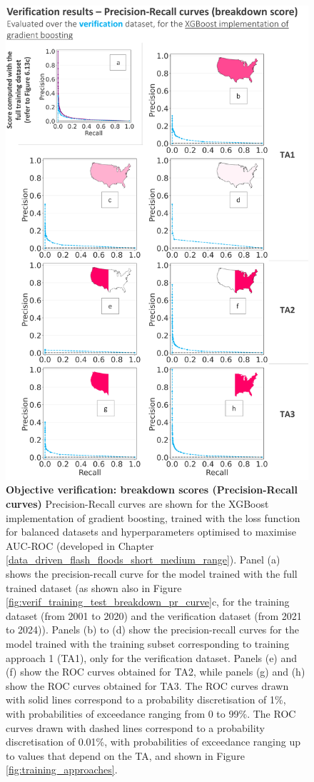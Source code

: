 \begin{figure}[htbp]
\centering
\includegraphics[scale = 0.95]{verif_breakdown_scores_pr_curve.png}
\caption{\textbf{Objective verification: breakdown scores (Precision-Recall curves)} Precision-Recall curves are shown for the XGBoost implementation of gradient boosting, trained with the loss function for balanced datasets and hyperparameters optimised to maximise AUC-ROC (developed in Chapter \ref{data_driven_flash_floods_short_medium_range}). Panel (a) shows the precision-recall curve for the model trained with the full trained dataset (as shown also in Figure \ref{fig:verif_training_test_breakdown_pr_curve}c, for the \textcolor{colourTraining}{training} dataset (from 2001 to 2020) and the \textcolor{colourTest}{verification} dataset (from 2021 to 2024)). Panels (b) to (d) show the precision-recall curves for the model trained with the training subset corresponding to training approach 1 (TA1), only for the \textcolor{colourTest}{verification} dataset. Panels (e) and (f) show the ROC curves obtained for TA2, while panels (g) and (h) show the ROC curves obtained for TA3. The ROC curves drawn with solid lines correspond to a probability discretisation of 1\%, with probabilities of exceedance ranging from 0 to 99\%. The ROC curves drawn with dashed lines correspond to a probability discretisation of 0.01\%, with probabilities of exceedance ranging up to values that depend on the TA, and shown in Figure \ref{fig:training_approaches}.}

\end{figure}
